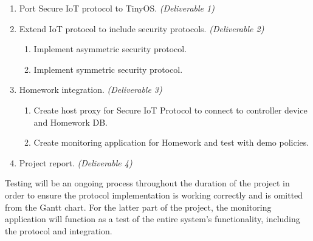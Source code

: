 \documentclass{mprop}
\begin{document}
{\small
\begin{enumerate}
  \item Port Secure IoT protocol to TinyOS. {\footnotesize\textit{(Deliverable 1)}}
  \item Extend IoT protocol to include security protocols. {\footnotesize\textit{(Deliverable 2)}}
  \begin{enumerate}
    \item Implement asymmetric security protocol.
    \item Implement symmetric security protocol.
  \end{enumerate}
  \item Homework integration. {\footnotesize\textit{(Deliverable 3)}}
  \begin{enumerate}
    \item Create host proxy for Secure IoT Protocol to connect to controller device and Homework DB.
    \item Create monitoring application for Homework and test with demo policies.
  \end{enumerate}
  \item Project report. {\footnotesize\textit{(Deliverable 4)}}
\end{enumerate}}

Testing will be an ongoing process throughout the duration of the project in order to ensure the protocol implementation is working correctly and is omitted from the Gantt chart. For the latter part of the project, the monitoring application will function as a test of the entire system's functionality, including the protocol and integration.

\end{document}
